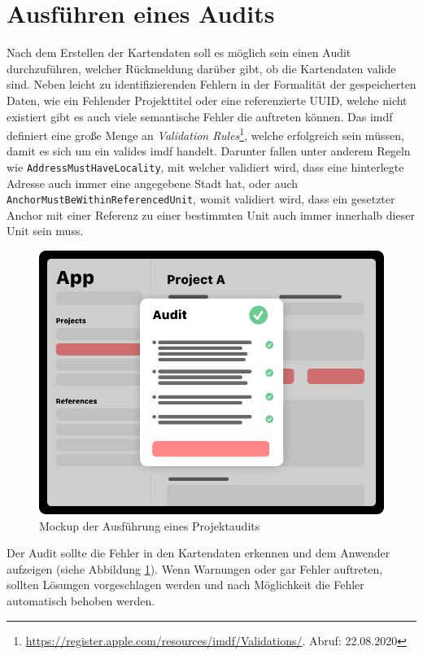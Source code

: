 \section{Ausführen eines Audits}
\label{sec:validation}
Nach dem Erstellen der Kartendaten soll es möglich sein einen Audit durchzuführen, welcher Rückmeldung darüber gibt, ob die Kartendaten valide sind.
Neben leicht zu identifizierenden Fehlern in der Formalität der gespeicherten Daten, wie ein Fehlender Projekttitel oder eine referenzierte UUID, welche nicht existiert gibt es auch viele semantische Fehler die auftreten können.
Das \acl{imdf} definiert eine große Menge an \emph{Validation Rules}\footnote{\url{https://register.apple.com/resources/imdf/Validations/}. Abruf: 22.08.2020}, welche erfolgreich sein müssen, damit es sich um ein valides \ac{imdf} handelt.
Darunter fallen unter anderem Regeln wie \texttt{AddressMustHaveLocality}, mit welcher validiert wird, dass eine hinterlegte Adresse auch immer eine angegebene Stadt hat, oder auch \texttt{AnchorMustBeWithinReferencedUnit}, womit validiert wird, dass ein gesetzter Anchor mit einer Referenz zu einer bestimmten Unit auch immer innerhalb dieser Unit sein muss.
\begin{figure}[h!]
	\centering
	\vspace{15pt}
	\includegraphics[scale=0.4]{images/design-project-audit}
	\caption{Mockup der Ausführung eines Projektaudits}
	\label{fig:design-project-audit}
\end{figure}
Der Audit sollte die Fehler in den Kartendaten erkennen und dem Anwender aufzeigen (siehe Abbildung \ref{fig:design-project-audit}).
Wenn Warnungen oder gar Fehler auftreten, sollten Lösungen vorgeschlagen werden und nach Möglichkeit die Fehler automatisch behoben werden.

